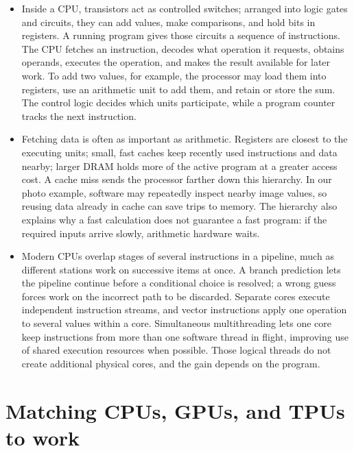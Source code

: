 \documentclass[10pt]{article}
\begin{document}
\begin{itemize}[leftmargin=1.25em, itemsep=0.3em, parsep=0pt, topsep=0pt]
    \item Inside a CPU, transistors act as controlled switches; arranged into logic gates and circuits, they can add values, make comparisons, and hold bits in registers. A running program gives those circuits a sequence of instructions. The CPU fetches an instruction, decodes what operation it requests, obtains operands, executes the operation, and makes the result available for later work. To add two values, for example, the processor may load them into registers, use an arithmetic unit to add them, and retain or store the sum. The control logic decides which units participate, while a program counter tracks the next instruction.

    \item Fetching data is often as important as arithmetic. Registers are closest to the executing units; small, fast caches keep recently used instructions and data nearby; larger DRAM holds more of the active program at a greater access cost. A cache miss sends the processor farther down this hierarchy. In our photo example, software may repeatedly inspect nearby image values, so reusing data already in cache can save trips to memory. The hierarchy also explains why a fast calculation does not guarantee a fast program: if the required inputs arrive slowly, arithmetic hardware waits.

    \item Modern CPUs overlap stages of several instructions in a pipeline, much as different stations work on successive items at once. A branch prediction lets the pipeline continue before a conditional choice is resolved; a wrong guess forces work on the incorrect path to be discarded. Separate cores execute independent instruction streams, and vector instructions apply one operation to several values within a core. Simultaneous multithreading lets one core keep instructions from more than one software thread in flight, improving use of shared execution resources when possible. Those logical threads do not create additional physical cores, and the gain depends on the program.
\end{itemize}

\section*{Matching CPUs, GPUs, and TPUs to work}
\end{document}
